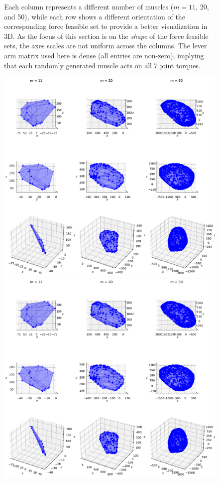 \begin{figure}[!htb]
    
    \caption{Each column represents a different number of muscles ($m = 11$, 20, and 50), while each row shows a different orientation of the corresponding force feasible set to provide a better visualization in 3D. As the focus of this section is on the \emph{shape} of the force feasible sets, the axes scales are not uniform across the columns. The lever arm matrix used here is dense (all entries are non-zero), implying that each randomly generated muscle acts on all 7 joint torques.
    }
    \label{fig:example_ellipsoidal_zonotope_multijoints}
\end{figure}

\begin{figure}[!htb]
    \captionsetup{justification=centering}
    \begin{minipage}{1\linewidth}
        \centering
        \includegraphics[trim={0 700 0 0},clip, width=0.9\linewidth]{img/chapter_3/zonotopes_looks_like_ellipsoids_2.pdf}
    \end{minipage}
    \begin{minipage}{1\linewidth}
        \centering
        \includegraphics[trim={0 500 0 60},clip, width=0.9\linewidth]{img/chapter_3/zonotopes_looks_like_ellipsoids_2.pdf}

\end{minipage}
\end{figure}

